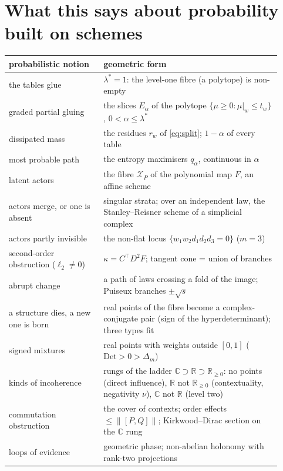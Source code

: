 \documentclass[11pt]{article}
\theoremstyle{definition}\newtheorem{definition}[theorem]{Definition}\newtheorem{remark}[theorem]{Remark}\newtheorem{example}[theorem]{Example}
\newcommand{\R}{\mathbb R}
\begin{document}
\section{What this says about probability built on schemes}\label{sec:summary}

\begin{table}[!htbp]\centering\small
\begin{tabular}{p{0.32\linewidth}p{0.6\linewidth}}\toprule
probabilistic notion & geometric form\\\midrule
the tables glue & $\lambda^*=1$: the level-one fibre (a polytope) is non-empty\\
graded partial gluing & the slices $E_\alpha$ of the polytope $\{\mu\ge0:\mu|_w\le t_w\}$, $0<\alpha\le\lambda^*$\\
dissipated mass & the residues $r_w$ of \eqref{eq:split}; $1-\alpha$ of every table\\
most probable path & the entropy maximisers $q_\alpha$, continuous in $\alpha$\\
latent actors & the fibre $\mathcal X_P$ of the polynomial map $F$, an affine scheme\\
actors merge, or one is absent & singular strata; over an independent law, the Stanley--Reisner scheme of a simplicial complex\\
actors partly invisible & the non-flat locus $\{w_1w_2d_1d_2d_3=0\}$ ($m=3$)\\
second-order obstruction ($\ell_2\neq0$) & $\kappa=C^\top D^2F$; tangent cone = union of branches\\
abrupt change & a path of laws crossing a fold of the image; Puiseux branches $\pm\sqrt s$\\
a structure dies, a new one is born & real points of the fibre become a complex-conjugate pair (sign of the hyperdeterminant); three types fit\\
signed mixtures & real points with weights outside $[0,1]$ ($\mathrm{Det}>0>\Delta_m$)\\
kinds of incoherence & rungs of the ladder $\mathbb C\supset\R\supset\R_{\ge0}$: no points (direct influence), $\R$ not $\R_{\ge0}$ (contextuality, negativity $\nu$), $\mathbb C$ not $\R$ (level two)\\
commutation obstruction & the cover of contexts; order effects $\le\|[P,Q]\|$; Kirkwood--Dirac section on the $\mathbb C$ rung\\
loops of evidence & geometric phase; non-abelian holonomy with rank-two projections\\

\end{tabular}
\end{table}
\end{document}
